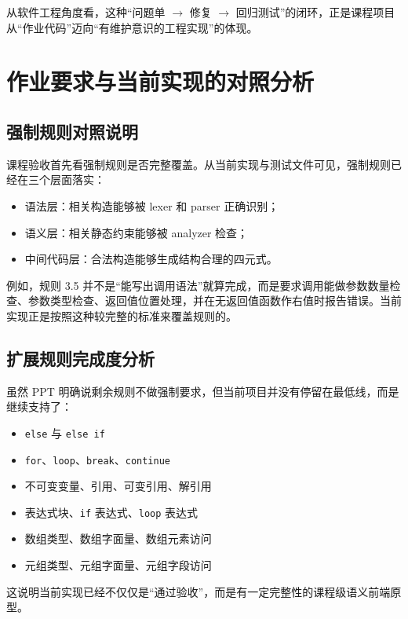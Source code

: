 \documentclass[UTF8,a4paper,12pt]{ctexart}
\newcommand{\pkg}[1]{\texttt{#1}}
\begin{document}
从软件工程角度看，这种“问题单 $\rightarrow$ 修复 $\rightarrow$ 回归测试”的闭环，正是课程项目从“作业代码”迈向“有维护意识的工程实现”的体现。

\section{作业要求与当前实现的对照分析}

\subsection{强制规则对照说明}

课程验收首先看强制规则是否完整覆盖。从当前实现与测试文件可见，强制规则已经在三个层面落实：

\begin{itemize}
    \item 语法层：相关构造能够被 lexer 和 parser 正确识别；
    \item 语义层：相关静态约束能够被 analyzer 检查；
    \item 中间代码层：合法构造能够生成结构合理的四元式。
\end{itemize}

例如，规则 3.5 并不是“能写出调用语法”就算完成，而是要求调用能做参数数量检查、参数类型检查、返回值位置处理，并在无返回值函数作右值时报告错误。当前实现正是按照这种较完整的标准来覆盖规则的。

\subsection{扩展规则完成度分析}

虽然 PPT 明确说剩余规则不做强制要求，但当前项目并没有停留在最低线，而是继续支持了：

\begin{itemize}
    \item \pkg{else} 与 \pkg{else if}
    \item \pkg{for}、\pkg{loop}、\pkg{break}、\pkg{continue}
    \item 不可变变量、引用、可变引用、解引用
    \item 表达式块、\pkg{if} 表达式、\pkg{loop} 表达式
    \item 数组类型、数组字面量、数组元素访问
    \item 元组类型、元组字面量、元组字段访问
\end{itemize}

这说明当前实现已经不仅仅是“通过验收”，而是有一定完整性的课程级语义前端原型。
\end{document}
